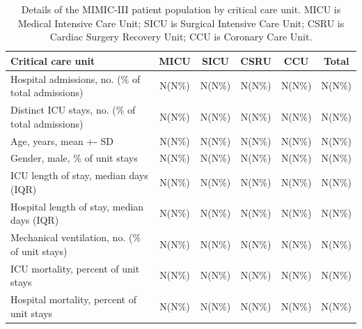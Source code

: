 \documentclass[english]{article}
\begin{document}
\begin{center}
\begin{table}
\begin{tabular}{|p{5cm}|c|c|c|c|c|}
    \hline
    Critical care unit & MICU & SICU & CSRU & CCU & Total \\ 
    \hline
    Hospital admissions, no. (\% of total admissions) & N(N\%) & N(N\%) & N(N\%) & N(N\%) & N(N\%) \\ 
    \hline
    Distinct ICU stays, no. (\% of total admissions) & N(N\%) & N(N\%) & N(N\%) & N(N\%) & N(N\%) \\ 
    \hline
    Age, years, mean +- SD & N(N\%) & N(N\%) & N(N\%) & N(N\%) & N(N\%) \\ 
    \hline
    Gender, male, \% of unit stays & N(N\%) & N(N\%) & N(N\%) & N(N\%) & N(N\%) \\ 
    \hline
    ICU length of stay, median days (IQR) & N(N\%) & N(N\%) & N(N\%) & N(N\%) & N(N\%) \\ 
    \hline
    Hospital length of stay, median days (IQR) & N(N\%) & N(N\%) & N(N\%) & N(N\%) & N(N\%) \\ 
    \hline
    Mechanical ventilation, no. (\% of unit stays) & N(N\%) & N(N\%) & N(N\%) & N(N\%) & N(N\%) \\ 
    \hline
    ICU mortality, percent of unit stays & N(N\%) & N(N\%) & N(N\%) & N(N\%) & N(N\%) \\ 
    \hline
    Hospital mortality, percent of unit stays & N(N\%) & N(N\%) & N(N\%) & N(N\%) & N(N\%) \\ 
    \hline
\end{tabular}
\caption{Details of the MIMIC-III patient population by critical care unit. MICU is Medical Intensive Care Unit; SICU is Surgical Intensive Care Unit; CSRU is Cardiac Surgery Recovery Unit; CCU is Coronary Care Unit.}
\label{table:patientpopulation}
\end{table}
\end{center}

\end{document}
